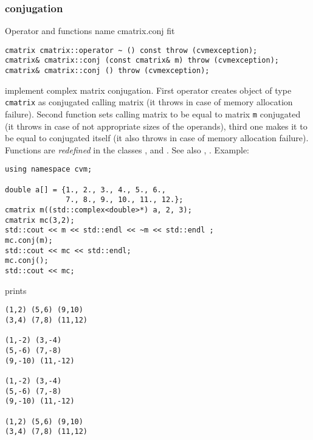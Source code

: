 \subsubsection{conjugation}
Operator and functions%
\pdfdest name {cmatrix.conj} fit
\begin{verbatim}
cmatrix cmatrix::operator ~ () const throw (cvmexception);
cmatrix& cmatrix::conj (const cmatrix& m) throw (cvmexception);
cmatrix& cmatrix::conj () throw (cvmexception);
\end{verbatim}
implement complex matrix conjugation.
First operator creates  object of type \verb"cmatrix" as
 conjugated calling matrix
(it throws  
in case of memory allocation failure). 
Second function sets  calling matrix to be equal to  matrix
\verb"m" conjugated
(it throws  
in case of not appropriate sizes of the operands), 
third one makes it to be equal to
conjugated itself (it also throws  
in case of memory allocation failure). 
Functions are \emph{redefined} in the classes
,  
and .
See also , .
Example:
\begin{Verbatim}
using namespace cvm;

double a[] = {1., 2., 3., 4., 5., 6.,
              7., 8., 9., 10., 11., 12.};
cmatrix m((std::complex<double>*) a, 2, 3);
cmatrix mc(3,2);
std::cout << m << std::endl << ~m << std::endl ;
mc.conj(m);
std::cout << mc << std::endl;
mc.conj();
std::cout << mc;
\end{Verbatim}
prints
\begin{Verbatim}
(1,2) (5,6) (9,10)
(3,4) (7,8) (11,12)

(1,-2) (3,-4)
(5,-6) (7,-8)
(9,-10) (11,-12)

(1,-2) (3,-4)
(5,-6) (7,-8)
(9,-10) (11,-12)

(1,2) (5,6) (9,10)
(3,4) (7,8) (11,12)
\end{Verbatim}
\newpage




